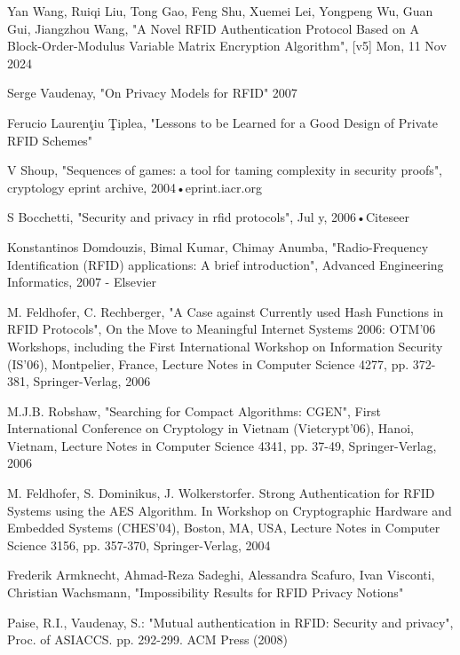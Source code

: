 \begin{thebibliography}{9}


Yan Wang, Ruiqi Liu, Tong Gao, Feng Shu, Xuemei Lei, Yongpeng Wu, Guan Gui, Jiangzhou Wang,
 "A Novel RFID Authentication Protocol Based on A Block-Order-Modulus Variable Matrix Encryption Algorithm", [v5] Mon, 11 Nov 2024

Serge Vaudenay, "On Privacy Models for RFID" 2007

Ferucio Laurenţiu Ţiplea, "Lessons to be Learned for a Good Design of Private RFID Schemes"

V Shoup, "Sequences of games: a tool for taming complexity in security proofs", cryptology eprint archive, 2004•eprint.iacr.org

S Bocchetti, "Security and privacy in rfid protocols", Jul y, 2006•Citeseer

Konstantinos Domdouzis, Bimal Kumar, Chimay Anumba, "Radio-Frequency Identification (RFID) applications: A brief introduction", Advanced Engineering Informatics, 2007 - Elsevier

M. Feldhofer, C. Rechberger, "A Case against Currently used Hash Functions in RFID Protocols", On the Move to Meaningful Internet Systems 2006: OTM'06 Workshops, including the First International Workshop on Information Security (IS'06), Montpelier, France, Lecture Notes in Computer Science 4277, pp. 372-381, Springer-Verlag, 2006

M.J.B. Robshaw, "Searching for Compact Algorithms: CGEN", First International Conference on Cryptology in Vietnam (Vietcrypt'06), Hanoi, Vietnam, Lecture Notes in Computer Science 4341, pp. 37-49, Springer-Verlag, 2006

M. Feldhofer, S. Dominikus, J. Wolkerstorfer. Strong Authentication for RFID Systems using the AES Algorithm. In Workshop on Cryptographic Hardware and Embedded Systems (CHES'04), Boston, MA, USA, Lecture Notes in Computer Science 3156, pp. 357-370, Springer-Verlag, 2004

Frederik Armknecht, Ahmad-Reza Sadeghi, Alessandra Scafuro, Ivan Visconti, Christian Wachsmann, "Impossibility Results for RFID Privacy Notions"

Paise, R.I., Vaudenay, S.: "Mutual authentication in RFID: Security and privacy", Proc. of ASIACCS. pp. 292-299. ACM Press (2008)

\end{thebibliography}